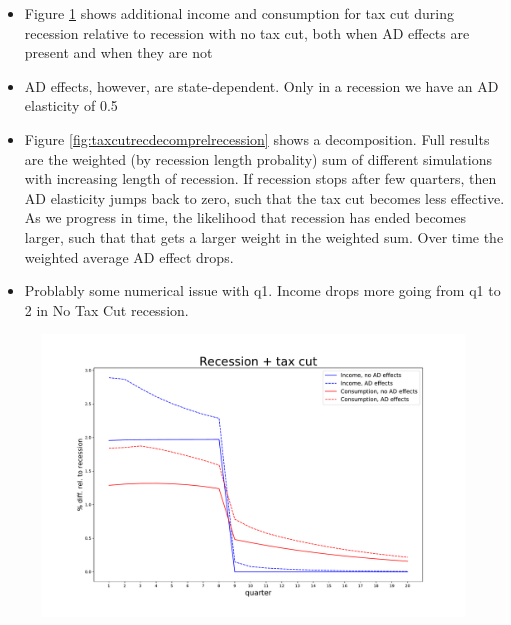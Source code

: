 \documentclass[]{article}
\begin{document}
\begin{itemize}
	\item Figure \ref{fig:recessiontaxcutrelrecession_statedep} shows additional income and consumption for tax cut during recession relative to recession with no tax cut, both when AD effects are present and when they are not
	\item AD effects, however, are state-dependent. Only in a recession we have an AD elasticity of 0.5
	\item Figure \ref{fig:taxcutrecdecomprelrecession} shows a decomposition. Full results are the weighted (by recession length probality) sum of different simulations with increasing length of recession. If recession stops after few quarters, then AD elasticity jumps back to zero, such that the tax cut becomes less effective. As we progress in time, the likelihood that recession has ended becomes larger, such that that gets a larger weight in the weighted sum. Over time the weighted average AD effect drops.
	\item Problably some numerical issue with q1. Income drops more going from q1 to 2 in No Tax Cut recession.
\end{itemize}

\begin{figure}
	\centering
	\includegraphics[width=\linewidth]{../Full_Run_Mar5/recession_taxcut_relrecession}
	\caption{}
	\label{fig:recessiontaxcutrelrecession_statedep}
\end{figure}
\end{document}
